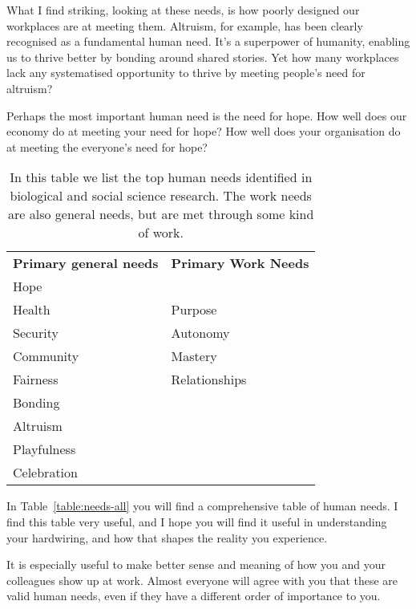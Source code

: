 What I find striking, looking at these needs, is how poorly designed our workplaces are at meeting them. Altruism, for example, has been clearly recognised as a fundamental human need. It's a superpower of humanity, enabling us to thrive better by bonding around shared stories. Yet how many workplaces lack any systematised opportunity to thrive by meeting people’s need for altruism?


Perhaps the most important human need is the need for hope.  How well does our economy do at meeting your need for hope? How well does your organisation do at meeting the everyone’s need for hope?


\begin{table}[ht]
        \centering
        \begin{tabular}{ R{0.30\textwidth} L{0.30\textwidth}}
                \toprule
                \textbf{Primary general needs} & \textbf{Primary Work Needs } \\
                \addlinespace[.5em]
                Hope & \\
                Health & Purpose \\
                Security & Autonomy \\
                Community & Mastery \\
                Fairness & Relationships \\
                Bonding & \\
                Altruism & \\
                Playfulness & \\
                Celebration & \\
                \bottomrule
        \end{tabular} 
        \caption[Top human needs]{In this table we list the top human needs identified in biological and social science research. The work needs are also general needs, but are met through some kind of work.}
        \label{table:needs-top}
\end{table}


In Table~\ref{table:needs-all} you will find a comprehensive table of human needs. I find this table very useful, and I hope you will find it useful in understanding your hardwiring, and how that shapes the reality you experience. 


It is especially useful to make better sense and meaning of how you and your colleagues show up at work. Almost everyone will agree with you that these are valid human needs, even if they have a different order of importance to you.


